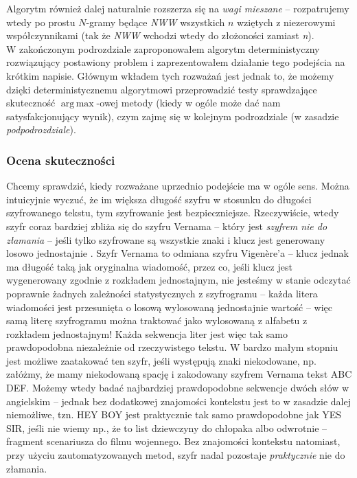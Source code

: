 \documentclass[a4paper]{article}
\DeclareMathOperator*{\argmax}{arg\,max}
\theoremstyle{defn}
\theoremstyle{theorem}
\theoremstyle{lemma}
\theoremstyle{cor}
\theoremstyle{fact}
\begin{document}
Algorytm również dalej naturalnie rozszerza się na \textit{wagi mieszane} – rozpatrujemy wtedy po prostu $N$-gramy będące \textit{NWW} wszystkich $n$ wziętych z niezerowymi współczynnikami (tak że \textit{NWW} wchodzi wtedy do złożoności zamiast \textit{n}).
\\

W zakończonym podrozdziale zaproponowałem algorytm deterministyczny rozwiązujący postawiony problem i zaprezentowałem działanie tego podejścia na krótkim napisie. Głównym wkładem tych rozważań jest jednak to, że możemy dzięki deterministycznemu algorytmowi przeprowadzić testy sprawdzające skuteczność $\argmax$-owej metody (kiedy w ogóle może dać nam satysfakcjonujący wynik), czym zajmę się w kolejnym podrozdziale (w zasadzie \textit{podpodrozdziale}).\\
\subsubsection{Ocena skuteczności}
Chcemy sprawdzić, kiedy rozważane uprzednio podejście ma w ogóle sens. Można intuicyjnie wyczuć, że im większa długość szyfru w stosunku do długości szyfrowanego tekstu, tym szyfrowanie jest bezpieczniejsze. Rzeczywiście, wtedy szyfr coraz bardziej zbliża się do szyfru Vernama – który jest \textit{szyfrem nie do złamania} – jeśli tylko szyfrowane są wszystkie znaki i klucz jest generowany losowo jednostajnie \cite{shannon}. Szyfr Vernama to odmiana szyfru Vigenère'a – klucz jednak ma długość taką jak oryginalna wiadomość, przez co, jeśli klucz jest wygenerowany zgodnie z rozkładem jednostajnym, nie jesteśmy w stanie odczytać poprawnie żadnych zależności statystycznych z szyfrogramu – każda litera wiadomości jest przesunięta o losową wylosowaną jednostajnie wartość – więc samą literę szyfrogramu można traktować jako wylosowaną z alfabetu z rozkładem jednostajnym! Każda sekwencja liter jest więc tak samo prawdopodobna niezależnie od rzeczywistego tekstu. W bardzo małym stopniu jest możliwe zaatakować ten szyfr, jeśli występują znaki niekodowane, np. załóżmy, że mamy niekodowaną spację i zakodowany szyfrem Vernama tekst ABC DEF. Możemy wtedy badać najbardziej prawdopodobne sekwencje dwóch słów w angielskim – jednak bez dodatkowej znajomości kontekstu jest to w zasadzie dalej niemożliwe, tzn. HEY BOY jest praktycznie tak samo prawdopodobne jak YES SIR, jeśli nie wiemy np., że to list dziewczyny do chłopaka albo odwrotnie – fragment scenariusza do filmu wojennego. Bez znajomości kontekstu natomiast, przy użyciu zautomatyzowanych metod, szyfr nadal pozostaje \textit{praktycznie} nie do złamania.\\
\end{document}
